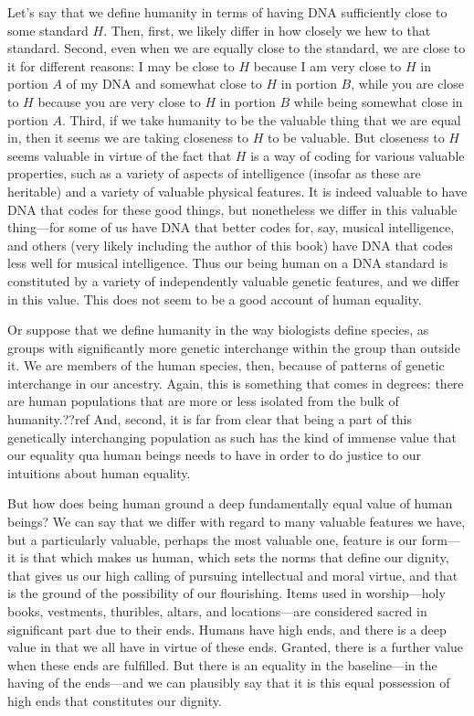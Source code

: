 Let's say that we define humanity in terms of having DNA sufficiently close to some standard $H$.
Then, first, we likely differ in how closely we hew to that standard. Second, even when we are equally close to the
standard, we are close to it for different reasons: I may be close to $H$ because I am very close to $H$ in portion $A$ of
my DNA and somewhat close to $H$ in portion $B$, while you are close to $H$ because you are very close to $H$ in portion
$B$ while being somewhat close in portion $A$. Third, if we take humanity to be the valuable thing that we are equal in,
then it seems we are taking closeness to $H$ to be valuable. But closeness to $H$ seems valuable in virtue of the fact
that $H$ is a way of coding for various valuable properties, such as a variety of aspects of intelligence (insofar as these
are heritable) and a variety of valuable physical features. It is indeed valuable to have DNA that codes for these good
things, but nonetheless we differ in this valuable thing---for some of us have DNA that better codes for, say, musical
intelligence, and others (very likely including the author of this book) have DNA that codes less well for musical 
intelligence. Thus our being human on a DNA standard is constituted by a variety of independently valuable genetic features,
and we differ in this value. This does not seem to be a good account of human equality.

Or suppose that we define humanity in the way biologists define species, as groups with significantly more genetic interchange
within the group than outside it. We are members of the human species, then, because of patterns of genetic interchange in our
ancestry. Again, this is something that comes in degrees: there are human populations that are more or less isolated from the 
bulk of humanity.??ref And, second, it is far from clear that being a part of this genetically interchanging population as such
has the kind of immense value that our equality qua human beings needs to have in order to do justice to our intuitions about
human equality.

But how does being human ground a deep fundamentally equal value of human beings? We can say that we differ with regard 
to many valuable features we have, but a particularly valuable, perhaps the most valuable one, feature is our form---it is 
that which makes us human, which sets the norms that define our dignity, that gives us our high calling of pursuing intellectual and moral virtue, and 
that is the ground of the possibility of our flourishing. Items used in  worship---holy books, vestments, thuribles, 
altars, and locations---are considered sacred in significant part due to their ends. Humans have high ends, and there is a
deep value in that we all have in virtue of these ends. Granted, there is a further value when these ends are fulfilled. 
But there is an equality in the baseline---in the having of the ends---and we can plausibly say that it is this equal
possession of high ends that constitutes our dignity. 

